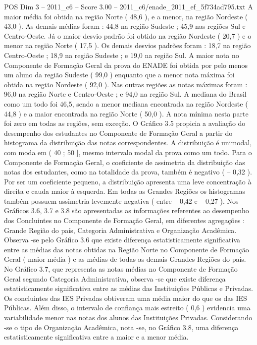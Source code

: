 \begin{textsample}{POS Dim 3 – 2011\_c6 – Score 3.00 – 2011\_c6/enade\_2011\_ef\_5f734ad795.txt}
A maior média foi obtida na região Norte ( 48,6 ), e a menor, na região Nordeste ( 43,0 ).
As demais médias foram : 44,8 na região Sudeste ; 45,9 nas regiões Sul e Centro-Oeste.
Já o maior desvio padrão foi obtido na região Nordeste ( 20,7 ) e o menor na região Norte ( 17,5 ).
Os demais desvios padrões foram : 18,7 na região Centro-Oeste ; 18,9 na região Sudeste ; e 19,0 na região Sul.
A maior nota no Componente de Formação Geral da prova do ENADE foi obtida por pelo menos um aluno da região Sudeste ( 99,0 ) enquanto que a menor nota máxima foi obtida na região Nordeste ( 92,0 ).
Nas outras regiões as notas máximas foram : 96,0 na região Norte e Centro-Oeste ; e 94,0 na região Sul.
A mediana do Brasil como um todo foi 46,5, sendo a menor mediana encontrada na região Nordeste ( 44,8 ) e a maior encontrada na região Norte ( 50,0 ).
A nota mínima nesta parte foi zero em todas as regiões, sem exceção.
O Gráfico 3.5 propicia a avaliação do desempenho dos estudantes no Componente de Formação Geral a partir do histograma da distribuição das notas correspondentes.
A distribuição é unimodal, com moda em ( 40 ; 50 ], mesmo intervalo modal da prova como um todo.
Para o Componente de Formação Geral, o coeficiente de assimetria da distribuição das notas dos estudantes, como na totalidade da prova, também é negativo ( – 0,32 ).
Por ser um coeficiente pequeno, a distribuição apresenta uma leve concentração à direita e cauda maior à esquerda.
Em todas as Grandes Regiões os histogramas também possuem assimetria levemente negativa ( entre – 0,42 e – 0,27 ).
Nos Gráficos 3.6, 3.7 e 3.8 são apresentadas as informações referentes ao desempenho dos Concluintes no Componente de Formação Geral, em diferentes agregações : Grande Região do país, Categoria Administrativa e Organização Acadêmica.
Observa -se pelo Gráfico 3.6 que existe diferença estatisticamente significativa entre as médias das notas obtidas na Região Norte no Componente de Formação Geral ( maior média ) e as médias de todas as demais Grandes Regiões do país.
No Gráfico 3.7, que representa as notas médias no Componente de Formação Geral segundo Categoria Administrativa, observa -se que existe diferença estatisticamente significativa entre as médias das Instituições Públicas e Privadas.
Os concluintes das IES Privadas obtiveram uma média maior do que os das IES Públicas.
Além disso, o intervalo de confiança mais estreito ( 0,6 ) evidencia uma variabilidade menor nas notas dos alunos das Instituições Privadas.
Considerando -se o tipo de Organização Acadêmica, nota -se, no Gráfico 3.8, uma diferença estatisticamente significativa entre a maior e a menor média.

\end{textsample}
